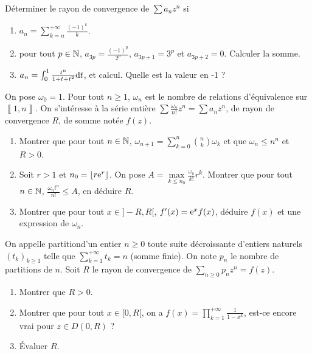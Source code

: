 \documentclass[12pt]{article}
\begin{document}
\begin{exercise}
    Déterminer le rayon de convergence de $\sum a_nz^{n}$ si
    \begin{enumerate}
        \item $a_n=\sum_{k=n}^{+\infty}\frac{(-1)^{k}}{k}$.
        \item pour tout $p\in\mathbb{N}$, $a_{3p}=\frac{(-1)^{p}}{2^{p}}$, $a_{3p+1}=3^{p}$ et $a_{3p+2}=0$. Calculer la somme.
        \item $a_n=\int_{0}^{1}\frac{t^{n}}{1+t+t^{2}}\mathrm{d} t$, et calcul. Quelle est la valeur en -1 ?
    \end{enumerate}
\end{exercise}

\begin{exercise}
    On pose $\omega_{0}=1$. Pour tout $n\geqslant1$, $\omega_n$ est le nombre de relations d'équivalence sur $\left\llbracket1,n\right\rrbracket$. On s'intéresse à la série entière $\sum \frac{\omega_n}{n!}z^{n}=\sum a_nz^{n}$, de rayon de convergence $R$, de somme notée $f(z)$.
    \begin{enumerate}
        \item Montrer que pour tout $n\in\mathbb{N}$, $\omega_{n+1}=\sum_{k=0}^{n}\binom{n}{k}\omega_k$ et que $\omega_{n}\leqslant n^{n}$ et $R>0$.
        \item Soit $r>1$ et $n_0=\left\lfloor r\mathrm{e}^{r}\right\rfloor$. On pose $A=\max\limits_{k\leqslant n_0}\frac{\omega_k}{k!}r^{k}$. Montrer que pour tout $n\in\mathbb{N}$, $\frac{\omega_nt^{n}}{n!}\leqslant A$, en déduire $R$.
        \item Montrer que pour tout $x\in]-R,R[$, $f'(x)=\mathrm{e}^{x}f(x)$, déduire $f(x)$ et une expression de $\omega_n$.
    \end{enumerate}
\end{exercise}

\begin{exercise}
    On appelle \og partition\fg d'un entier $n\geqslant0$ toute suite décroissante d'entiers naturels $(t_k)_{k\geqslant1}$ telle que $\sum_{k=1}^{+\infty}t_k=n$ (somme finie). On note $p_n$ le nombre de partitions de $n$. Soit $R$ le rayon de convergence de $\sum_{n\geqslant0}p_n z^{n}=f(z)$.
    \begin{enumerate}
        \item Montrer que $R>0$.
        \item Montrer que pour tout $x\in[0,R[$, on a $f(x)=\prod_{k=1}^{+\infty}\frac{1}{1-x^{k}}$, est-ce encore vrai pour $z\in D(0,R)$ ?
        \item Évaluer $R$.
    \end{enumerate}
\end{exercise}
\end{document}

